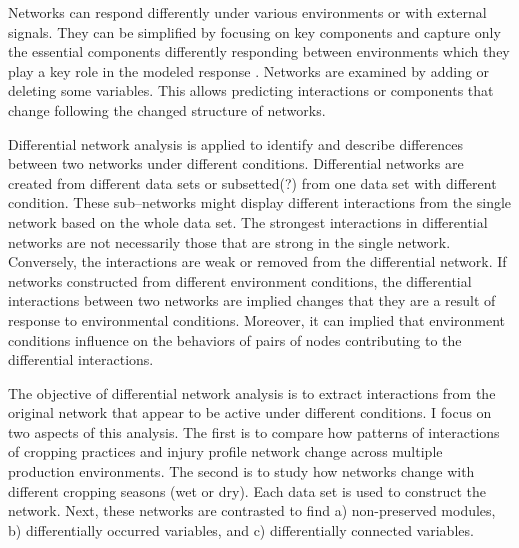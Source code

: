 Networks can respond differently under various environments or with external signals. They can be simplified by focusing on key components and capture only the essential components differently responding between environments which they play a key role in the modeled response . Networks are examined by adding or deleting some variables. This allows predicting interactions or components that change following the changed structure of networks. 

Differential network analysis is applied to identify and describe differences between two networks under different conditions. Differential networks are created from different data sets or subsetted(?) from one data set with different condition. These sub--networks might display different interactions from the single network based on the whole data set. The strongest interactions in differential networks are not necessarily those that are strong in the single network. Conversely, the interactions are weak or removed from the differential network. If networks constructed from different environment conditions, the differential interactions between two networks are implied changes that they are a result of response to environmental conditions. Moreover, it can implied that environment conditions influence on the behaviors of pairs of nodes contributing to the differential interactions. 


The objective of differential network analysis is to extract interactions from the original network that appear to be active under different conditions. I focus on two aspects of this analysis. The first is to compare how patterns of interactions of cropping practices and injury profile network change across multiple production environments. The second is to study how networks change with different cropping seasons (wet or dry). Each data set is used to construct the network. Next, these networks are contrasted to find a) non-preserved modules, b) differentially occurred variables, and c) differentially connected variables.

